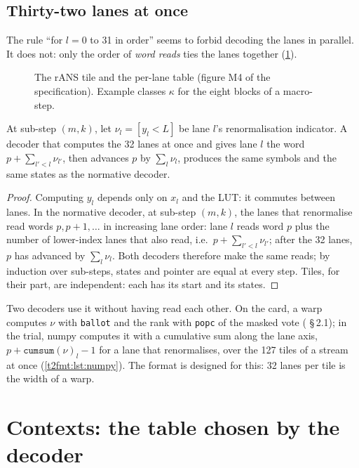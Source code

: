 \subsection{Thirty-two lanes at once}

The rule ``for $l = 0$ to 31 in order'' seems to forbid decoding the lanes in parallel. It does not: only the order of \emph{word reads} ties the lanes together (\cref{t2fmt:fig:tuile}).

\begin{figure}[ht]
\centering
\TdFmtTuile
\caption[The rANS tile and the per-lane table]{The rANS tile and the per-lane table (figure M4 of the specification). Example classes $\kappa$ for the eight blocks of a macro-step.}
\label{t2fmt:fig:tuile}
\end{figure}

\begin{proposition}\label{t2fmt:prop:parallele}
At sub-step $(m, k)$, let $\nu_l = [y_l < L]$ be lane $l$'s renormalisation indicator. A decoder that computes the 32 lanes at once and gives lane $l$ the word $p + \sum_{l' < l} \nu_{l'}$, then advances $p$ by $\sum_l \nu_l$, produces the same symbols and the same states as the normative decoder.
\end{proposition}
\begin{proof}
Computing $y_l$ depends only on $x_l$ and the LUT: it commutes between lanes. In the normative decoder, at sub-step $(m, k)$, the lanes that renormalise read words $p, p+1, \dots$ in increasing lane order: lane $l$ reads word $p$ plus the number of lower-index lanes that also read, i.e.\ $p + \sum_{l'<l} \nu_{l'}$; after the 32 lanes, $p$ has advanced by $\sum_l \nu_l$. Both decoders therefore make the same reads; by induction over sub-steps, states and pointer are equal at every step. Tiles, for their part, are independent: each has its start and its states.
\end{proof}

Two decoders use it without having read each other. On the card, a warp computes $\nu$ with \texttt{ballot} and the rank with \texttt{popc} of the masked vote ( §\,2.1); in the trial, numpy computes it with a cumulative sum along the lane axis, $p + \texttt{cumsum}(\nu)_l - 1$ for a lane that renormalises, over the 127 tiles of a stream at once (\cref{t2fmt:lst:numpy}). The format is designed for this: 32 lanes per tile is the width of a warp.

\section{Contexts: the table chosen by the decoder}\label{t2fmt:sec:contextes}

